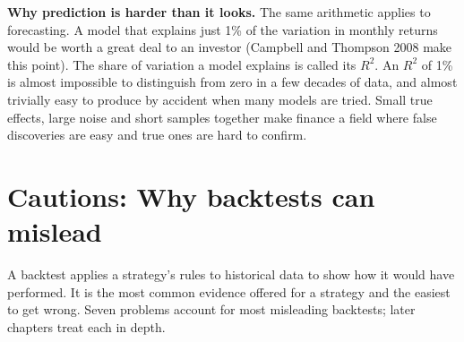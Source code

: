 
\textbf{Why prediction is harder than it looks.} The same arithmetic applies to forecasting. A model that explains just 1\% of the variation in monthly returns would be worth a great deal to an investor (Campbell and Thompson 2008 make this point). The share of variation a model explains is called its \textbf{$R^2$}. An $R^2$ of 1\% is almost impossible to distinguish from zero in a few decades of data, and almost trivially easy to produce by accident when many models are tried. Small true effects, large noise and short samples together make finance a field where false discoveries are easy and true ones are hard to confirm.

\section{Cautions: Why backtests can mislead}
\label{sec:01-backtests}

A backtest applies a strategy's rules to historical data to show how it would have performed. It is the most common evidence offered for a strategy and the easiest to get wrong. Seven problems account for most misleading backtests; later chapters treat each in depth.

